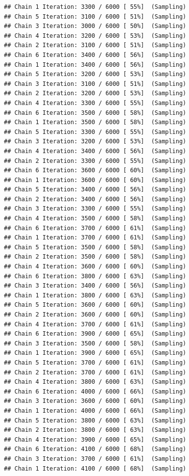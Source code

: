 \documentclass[
]{article}
\begin{document}
\begin{verbatim}
## Chain 1 Iteration: 3300 / 6000 [ 55%]  (Sampling) 
## Chain 5 Iteration: 3100 / 6000 [ 51%]  (Sampling) 
## Chain 3 Iteration: 3000 / 6000 [ 50%]  (Sampling) 
## Chain 4 Iteration: 3200 / 6000 [ 53%]  (Sampling) 
## Chain 2 Iteration: 3100 / 6000 [ 51%]  (Sampling) 
## Chain 6 Iteration: 3400 / 6000 [ 56%]  (Sampling) 
## Chain 1 Iteration: 3400 / 6000 [ 56%]  (Sampling) 
## Chain 5 Iteration: 3200 / 6000 [ 53%]  (Sampling) 
## Chain 3 Iteration: 3100 / 6000 [ 51%]  (Sampling) 
## Chain 2 Iteration: 3200 / 6000 [ 53%]  (Sampling) 
## Chain 4 Iteration: 3300 / 6000 [ 55%]  (Sampling) 
## Chain 6 Iteration: 3500 / 6000 [ 58%]  (Sampling) 
## Chain 1 Iteration: 3500 / 6000 [ 58%]  (Sampling) 
## Chain 5 Iteration: 3300 / 6000 [ 55%]  (Sampling) 
## Chain 3 Iteration: 3200 / 6000 [ 53%]  (Sampling) 
## Chain 4 Iteration: 3400 / 6000 [ 56%]  (Sampling) 
## Chain 2 Iteration: 3300 / 6000 [ 55%]  (Sampling) 
## Chain 6 Iteration: 3600 / 6000 [ 60%]  (Sampling) 
## Chain 1 Iteration: 3600 / 6000 [ 60%]  (Sampling) 
## Chain 5 Iteration: 3400 / 6000 [ 56%]  (Sampling) 
## Chain 2 Iteration: 3400 / 6000 [ 56%]  (Sampling) 
## Chain 3 Iteration: 3300 / 6000 [ 55%]  (Sampling) 
## Chain 4 Iteration: 3500 / 6000 [ 58%]  (Sampling) 
## Chain 6 Iteration: 3700 / 6000 [ 61%]  (Sampling) 
## Chain 1 Iteration: 3700 / 6000 [ 61%]  (Sampling) 
## Chain 5 Iteration: 3500 / 6000 [ 58%]  (Sampling) 
## Chain 2 Iteration: 3500 / 6000 [ 58%]  (Sampling) 
## Chain 4 Iteration: 3600 / 6000 [ 60%]  (Sampling) 
## Chain 6 Iteration: 3800 / 6000 [ 63%]  (Sampling) 
## Chain 3 Iteration: 3400 / 6000 [ 56%]  (Sampling) 
## Chain 1 Iteration: 3800 / 6000 [ 63%]  (Sampling) 
## Chain 5 Iteration: 3600 / 6000 [ 60%]  (Sampling) 
## Chain 2 Iteration: 3600 / 6000 [ 60%]  (Sampling) 
## Chain 4 Iteration: 3700 / 6000 [ 61%]  (Sampling) 
## Chain 6 Iteration: 3900 / 6000 [ 65%]  (Sampling) 
## Chain 3 Iteration: 3500 / 6000 [ 58%]  (Sampling) 
## Chain 1 Iteration: 3900 / 6000 [ 65%]  (Sampling) 
## Chain 5 Iteration: 3700 / 6000 [ 61%]  (Sampling) 
## Chain 2 Iteration: 3700 / 6000 [ 61%]  (Sampling) 
## Chain 4 Iteration: 3800 / 6000 [ 63%]  (Sampling) 
## Chain 6 Iteration: 4000 / 6000 [ 66%]  (Sampling) 
## Chain 3 Iteration: 3600 / 6000 [ 60%]  (Sampling) 
## Chain 1 Iteration: 4000 / 6000 [ 66%]  (Sampling) 
## Chain 5 Iteration: 3800 / 6000 [ 63%]  (Sampling) 
## Chain 2 Iteration: 3800 / 6000 [ 63%]  (Sampling) 
## Chain 4 Iteration: 3900 / 6000 [ 65%]  (Sampling) 
## Chain 6 Iteration: 4100 / 6000 [ 68%]  (Sampling) 
## Chain 3 Iteration: 3700 / 6000 [ 61%]  (Sampling) 
## Chain 1 Iteration: 4100 / 6000 [ 68%]  (Sampling) 

\end{verbatim}
\end{document}
